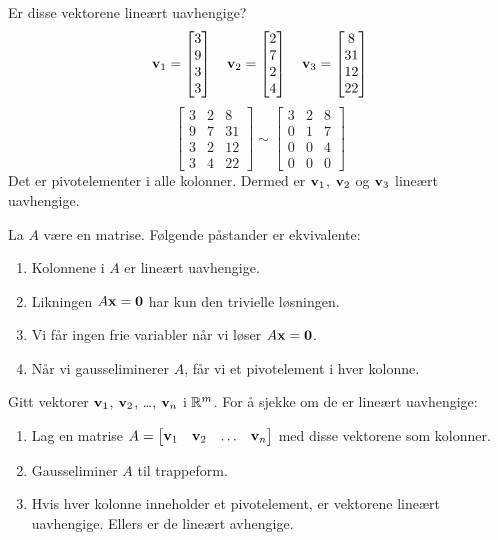 \begin{ex}
Er disse vektorene lineært uavhengige?
\[
\mathbf{v}_1 = \begin{bmatrix} 3 \\ 9 \\ 3 \\ 3 \end{bmatrix}\quad
\mathbf{v}_2 = \begin{bmatrix} 2 \\ 7 \\ 2 \\ 4 \end{bmatrix}\quad
\mathbf{v}_3 = \begin{bmatrix} 8 \\ 31 \\ 12 \\ 22 \end{bmatrix}
\]
\[
\begin{bmatrix}
3 & 2 & 8 \\
9 & 7 & 31 \\
3 & 2 & 12 \\
3 & 4 & 22
\end{bmatrix}
\sim
\begin{bmatrix}
3 & 2 & 8 \\
0 & 1 & 7 \\
0 & 0 & 4 \\
0 & 0 & 0
\end{bmatrix}
\]
Det er pivotelementer i alle kolonner.  Dermed er $\mathbf{v}_1$,
$\mathbf{v}_2$ og $\mathbf{v}_3$ lineært uavhengige.
\end{ex}


\begin{thm}
\label{thm:linuavh}
La $A$ være en matrise.  Følgende påstander er ekvivalente:
\begin{enumerate}
\item Kolonnene i $A$ er lineært uavhengige.
\item Likningen $A \mathbf{x} = \mathbf{0}$ har kun den trivielle løsningen.
\item Vi får ingen frie variabler når vi løser $A \mathbf{x} = \mathbf{0}$.
\item Når vi gausseliminerer $A$, får vi et pivotelement i hver kolonne.
\end{enumerate}
\end{thm}

Gitt vektorer $\mathbf{v}_1$, $\mathbf{v}_2$, \ldots, $\mathbf{v}_n$ i $\mathbb{R}^m$.  For å
sjekke om de er lineært uavhengige:
\begin{enumerate}
\item Lag en matrise
$A = \begin{bmatrix} \mathbf{v}_1 & \mathbf{v}_2 & \ldots &
\mathbf{v}_n \end{bmatrix}$ med disse vektorene som kolonner.
\item Gausseliminer $A$ til trappeform.
\item Hvis hver kolonne inneholder et pivotelement, er vektorene lineært uavhengige.
Ellers er de lineært avhengige.
\end{enumerate}


